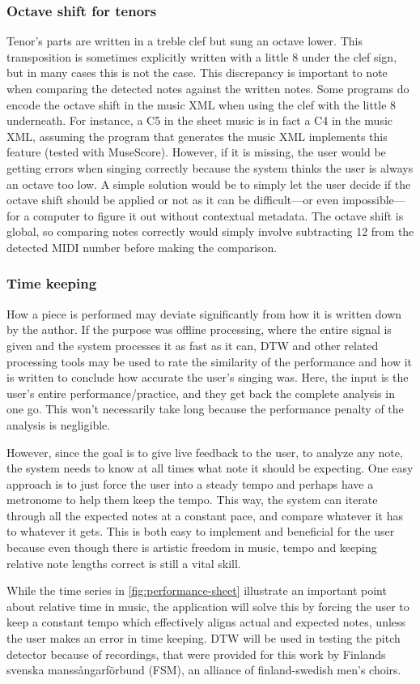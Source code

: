 \subsubsection{Octave shift for tenors}
Tenor's parts are written in a treble clef but sung an octave lower. This transposition is sometimes explicitly written with a little 8 under the clef sign, but in many cases this is not the case. This discrepancy is important to note when comparing the detected notes against the written notes. Some programs do encode the octave shift in the music XML when using the clef with the little 8 underneath. For instance, a C5 in the sheet music is in fact a C4 in the music XML, assuming the program that generates the music XML implements this feature (tested with MuseScore). However, if it is missing, the user would be getting errors when singing correctly because the system thinks the user is always an octave too low. A simple solution would be to simply let the user decide if the octave shift should be applied or not as it can be difficult—or even impossible—for a computer to figure it out without contextual metadata. The octave shift is global, so comparing notes correctly would simply involve subtracting 12 from the detected MIDI number before making the comparison.

\subsubsection{Time keeping}
How a piece is performed may deviate significantly from how it is written down by the author. If the purpose was offline processing, where the entire signal is given and the system processes it as fast as it can, DTW and other related processing tools may be used to rate the similarity of the performance and how it is written to conclude how accurate the user's singing was. Here, the input is the user's entire performance/practice, and they get back the complete analysis in one go. This won't necessarily take long because the performance penalty of the analysis is negligible.

However, since the goal is to give live feedback to the user, to analyze any note, the system needs to know at all times what note it should be expecting. One easy approach is to just force the user into a steady tempo and perhaps have a metronome to help them keep the tempo. This way, the system can iterate through all the expected notes at a constant pace, and compare whatever it has to whatever it gets. This is both easy to implement and beneficial for the user because even though there is artistic freedom in music, tempo and keeping relative note lengths correct is still a vital skill. 

While the time series in \ref{fig:performance-sheet} illustrate an important point about relative time in music, the application will solve this by forcing the user to keep a constant tempo which effectively aligns actual and expected notes, unless the user makes an error in time keeping. DTW will be used in testing the pitch detector because of recordings, that were provided for this work by Finlands svenska manssångarförbund (FSM), an alliance of finland-swedish men's choirs. 
